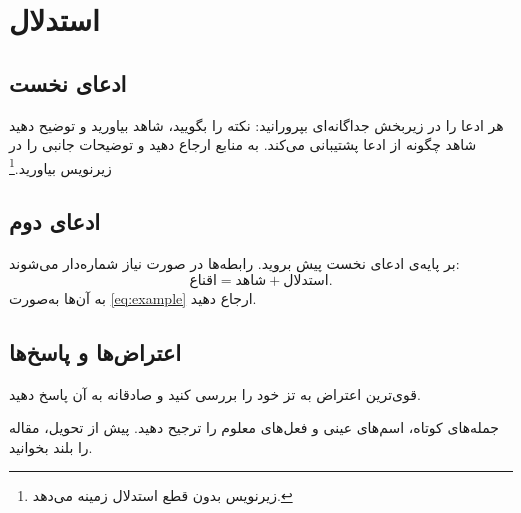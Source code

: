 \section{استدلال}

\subsection{ادعای نخست}
هر ادعا را در زیربخش جداگانه‌ای بپرورانید: نکته را بگویید، شاهد بیاورید و توضیح دهید شاهد چگونه از ادعا پشتیبانی
می‌کند. به منابع ارجاع دهید \cite{strunk1999} و توضیحات جانبی را در زیرنویس بیاورید.\footnote{زیرنویس بدون قطع استدلال زمینه می‌دهد.}

\subsection{ادعای دوم}
بر پایه‌ی ادعای نخست پیش بروید. رابطه‌ها در صورت نیاز شماره‌دار می‌شوند:
\begin{equation}\label{eq:example}
  \text{اقناع} = \text{شاهد} + \text{استدلال}.
\end{equation}
به آن‌ها به‌صورت \cref{eq:example} ارجاع دهید.

\subsection{اعتراض‌ها و پاسخ‌ها}
قوی‌ترین اعتراض به تز خود را بررسی کنید و صادقانه به آن پاسخ دهید.

\begin{notebox}[نگارش]
جمله‌های کوتاه، اسم‌های عینی و فعل‌های معلوم را ترجیح دهید. پیش از تحویل، مقاله را بلند بخوانید.
\end{notebox}
